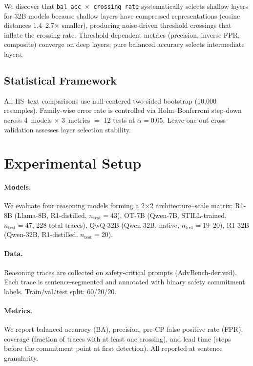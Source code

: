 \documentclass[11pt,a4paper]{article}
\begin{document}
We discover that \texttt{bal\_acc $\times$ crossing\_rate} systematically selects shallow layers for 32B models because shallow layers have compressed representations (cosine distances 1.4--2.7$\times$ smaller), producing noise-driven threshold crossings that inflate the crossing rate.
Threshold-dependent metrics (precision, inverse FPR, composite) converge on deep layers; pure balanced accuracy selects intermediate layers.

\subsection{Statistical Framework}

All HS--text comparisons use null-centered two-sided bootstrap (10{,}000 resamples).
Family-wise error rate is controlled via Holm--Bonferroni step-down across 4~models $\times$ 3~metrics $=$ 12 tests at $\alpha = 0.05$.
Leave-one-out cross-validation assesses layer selection stability.

\section{Experimental Setup}
\label{sec:setup}

\paragraph{Models.}
We evaluate four reasoning models forming a 2$\times$2 architecture--scale matrix:
R1-8B (Llama-8B, R1-distilled, $n_{\text{test}}=43$),
OT-7B (Qwen-7B, STILL-trained, $n_{\text{test}}=47$, 228 total traces),
QwQ-32B (Qwen-32B, native, $n_{\text{test}}=19$--20),
R1-32B (Qwen-32B, R1-distilled, $n_{\text{test}}=20$).

\paragraph{Data.}
Reasoning traces are collected on safety-critical prompts (AdvBench-derived).
Each trace is sentence-segmented and annotated with binary safety commitment labels.
Train/val/test split: 60/20/20.

\paragraph{Metrics.}
We report balanced accuracy (BA), precision, pre-CP false positive rate (FPR), coverage (fraction of traces with at least one crossing), and lead time (steps before the commitment point at first detection).
All reported at sentence granularity.
\end{document}
